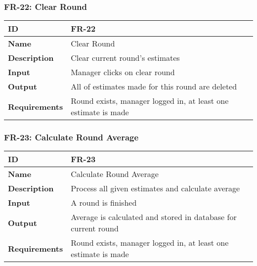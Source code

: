 \subsubsection{FR-22: Clear Round}
\begin{center}
  \begin{tabularx}{\textwidth}{|l|X|}
      \hline
      \textbf{ID} & FR-22 \\
      \hline
      \textbf{Name} & Clear Round \\
      \hline
      \textbf{Description} & Clear current round's estimates \\
      \hline
      \textbf{Input} & Manager clicks on clear round \\
      \hline
      \textbf{Output} & All of estimates made for this round are deleted \\
      \hline
      \textbf{Requirements} & Round exists, manager logged in, at least one estimate is made \\
      \hline
  \end{tabularx}
\end{center}

\subsubsection{FR-23: Calculate Round Average}
\begin{center}
  \begin{tabularx}{\textwidth}{|l|X|}
      \hline
      \textbf{ID} & FR-23 \\
      \hline
      \textbf{Name} & Calculate Round Average \\
      \hline
      \textbf{Description} & Process all given estimates and calculate average \\
      \hline
      \textbf{Input} & A round is finished \\
      \hline
      \textbf{Output} & Average is calculated and stored in database for current round \\
      \hline
      \textbf{Requirements} & Round exists, manager logged in, at least one estimate is made \\
      \hline
  \end{tabularx}
\end{center}

